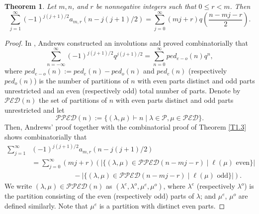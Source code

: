 \documentclass{amsart}
\newtheorem{theorem}{Theorem}[section]
\theoremstyle{definition}
\begin{document}
\begin{theorem}{\cite[Corollary 4.9]{M23}} \label{Cor4.9} Let $m,n$, and $r$ be nonnegative integers such that $0\leq r<m$. Then \begin{equation} \label{C4.9} \sum_{j=1}^\infty (-1)^{j(j+1)/2} a_{m,r}(n-j(j+1)/2)= \sum_{j=0}^\infty (mj+r)q\left(\frac{n-mj-r}{2}\right).\end{equation}\end{theorem}
\begin{proof}In \cite{A72},  Andrews constructed an involutions and proved  combinatorially that $$\sum_{n=-\infty}^\infty (-1)^{j(j+1)/2}q^{j(j+1)/2}=\sum_{n=0}^\infty ped_{e-o}(n)q^n,$$ where $ped_{e-o}(n):=ped_e(n)-ped_o(n)$ and $ped_e(n)$ (respectively $ped_o(n)$) is the number of partitions of $n$ with even parts distinct and odd parts unrestricted and an even (respectively odd) total number of parts. Denote by $\mathcal {PED}(n)$ the set of partitions of $n$ with even parts distinct and odd parts unrestricted and let $$\mathcal{PPED}(n):=\{(\lambda, \mu)\vdash n\mid \lambda\in \mathcal P, \mu \in \mathcal{PED}\}.$$ 
Then, Andrews' proof together with the combinatorial proof of Theorem \ref{T1.3} shows combinatorially that 
\begin{align*}\sum_{j=1}^\infty & (-1)^{j(j+1)/2} a_{m,r}(n-j(j+1)/2)\\ & =\sum_{j=0}^\infty (mj+r)\left(|\{(\lambda, \mu)\in  \mathcal{PPED}(n-mj-r) \mid \ell(\mu) \text{ even}\}|\right.\\  &\qquad \qquad\qquad-\left. |\{(\lambda, \mu)\in  \mathcal{PPED}(n-mj-r) \mid \ell(\mu) \text{ odd}\}|\right).
\end{align*} 
We write  $(\lambda, \mu)\in \mathcal{PPED}(n)$ as $(\lambda^e, \lambda^o, \mu^e, \mu^o)$, where $\lambda^e$ (respectively $\lambda^o$) is the partition consisting of the even (respectively odd) parts of $\lambda$; and $\mu^e$, $\mu^o$ are defined similarly. Note that $\mu^e$ is a partition with distinct even parts. 


\end{proof}
\end{document}
